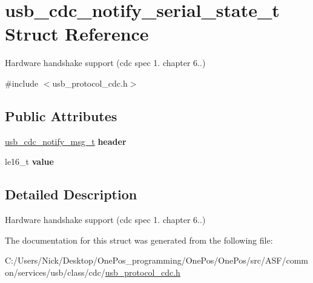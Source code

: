 \hypertarget{structusb__cdc__notify__serial__state__t}{\section{usb\-\_\-cdc\-\_\-notify\-\_\-serial\-\_\-state\-\_\-t Struct Reference}
\label{structusb__cdc__notify__serial__state__t}
}


Hardware handshake support (cdc spec 1. chapter 6..)  




{\ttfamily \#include $<$usb\-\_\-protocol\-\_\-cdc.\-h$>$}

\subsection*{Public Attributes}
\begin{DoxyCompactItemize}
\item 
\hypertarget{structusb__cdc__notify__serial__state__t_aca542b1ab1aa7c5dc0d72bd31baf2d03}{\hyperlink{structusb__cdc__notify__msg__t}{usb\-\_\-cdc\-\_\-notify\-\_\-msg\-\_\-t} {\bfseries header}}\label{structusb__cdc__notify__serial__state__t_aca542b1ab1aa7c5dc0d72bd31baf2d03}

\item 
\hypertarget{structusb__cdc__notify__serial__state__t_a4183db1e7c5174bce0453504b6e91463}{le16\-\_\-t {\bfseries value}}\label{structusb__cdc__notify__serial__state__t_a4183db1e7c5174bce0453504b6e91463}

\end{DoxyCompactItemize}


\subsection{Detailed Description}
Hardware handshake support (cdc spec 1. chapter 6..) 

The documentation for this struct was generated from the following file\-:\begin{DoxyCompactItemize}
\item 
C\-:/\-Users/\-Nick/\-Desktop/\-One\-Pos\-\_\-programming/\-One\-Pos/\-One\-Pos/src/\-A\-S\-F/common/services/usb/class/cdc/\hyperlink{usb__protocol__cdc_8h}{usb\-\_\-protocol\-\_\-cdc.\-h}\end{DoxyCompactItemize}
